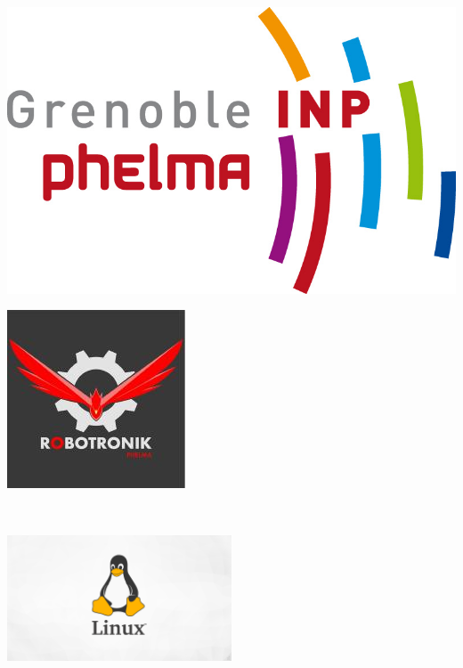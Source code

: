 \documentclass[12pt,openany]{report} %
\begin{document}
\begin{titlepage}
	\begin{center}
		\begin{minipage}{\linewidth}
			\begin{minipage}{0.5\linewidth}
				\includegraphics[width=0.5\linewidth]{Images/logo_phelma.jpg}
			\end{minipage}
			\hspace{0.25\linewidth}
			\begin{minipage}{0.5\linewidth}
				\includegraphics[width=0.5\linewidth]{Images/logoclub.jpg}
			\end{minipage}
		\end{minipage}


		\vfill

		{\large \textbf{}}\\
		\vspace*{1cm}
		{\LARGE\textbf{\@title}}

		\vfill

		\includegraphics[width=0.5\textwidth]{Images/tux.png}

		\vfill

		{\large\emph{} \textbf{}}\\
		\vspace*{0.5cm}
		{\large\textbf{\@author}}\\

		\vfill

		{\large \@date}
	\end{center}
\end{titlepage}
\end{document}
